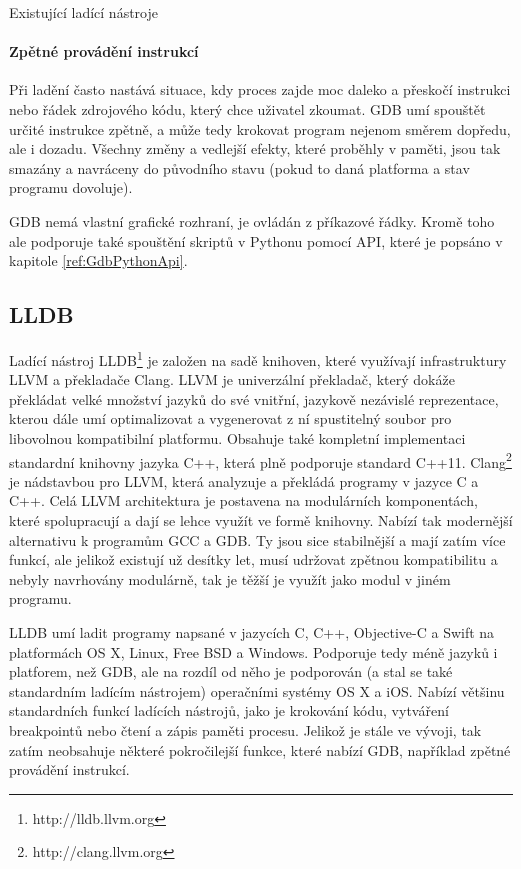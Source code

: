 \documentclass[czech,bachelor,male,python,dept460,hidelinks]{diploma}						%
\newcommand{\parspace}[1][]{
	\ifthenelse{\isempty{#1}}{\vspace{5mm}}{\vspace{#1}}
	\par
}
\begin{document}
\begin{section}{Existující ladící nástroje}
		\paragraph*{Zpětné provádění instrukcí}
			Při ladění často nastává situace, kdy proces zajde moc daleko a přeskočí instrukci nebo řádek zdrojového kódu, který chce uživatel zkoumat.
			GDB umí spouštět určité instrukce zpětně, a může tedy krokovat program nejenom směrem dopředu, ale i dozadu.
			Všechny změny a vedlejší efekty, které proběhly v paměti, jsou tak smazány a navráceny do původního stavu (pokud to daná platforma a stav programu dovoluje).
		
		\parspace GDB nemá vlastní grafické rozhraní, je ovládán z příkazové řádky. Kromě toho ale podporuje také spouštění skriptů v Pythonu pomocí API,
		které je popsáno v kapitole \ref{ref:GdbPythonApi}.
	\subsection{LLDB}
		Ladící nástroj LLDB\footnote{http://lldb.llvm.org} je založen na sadě knihoven, které využívají infrastruktury LLVM a překladače Clang.
		LLVM je univerzální překladač, který dokáže překládat velké množství jazyků do své vnitřní, jazykově nezávislé reprezentace, kterou dále umí
		optimalizovat a vygenerovat z ní spustitelný soubor pro libovolnou kompatibilní platformu. Obsahuje také kompletní implementaci standardní
		knihovny jazyka C++, která plně podporuje standard C++11. Clang\footnote{http://clang.llvm.org} je nádstavbou pro LLVM, která analyzuje a
		překládá programy v jazyce C a C++. Celá LLVM architektura je postavena na modulárních komponentách, které spolupracují a dají se lehce využít ve
		formě knihovny. Nabízí tak modernější alternativu k programům GCC a GDB. Ty jsou sice stabilnější a mají zatím více funkcí, ale jelikož existují už
		desítky let, musí udržovat zpětnou kompatibilitu a nebyly navrhovány modulárně, tak je těžší je využít jako modul v jiném programu.
		
		\parspace LLDB umí ladit programy napsané v jazycích C, C++, Objective-C a Swift na platformách OS X, Linux, Free BSD a Windows. Podporuje tedy méně jazyků
		i platforem, než GDB, ale na rozdíl od něho je podporován (a stal se také standardním ladícím nástrojem) operačními systémy OS X a iOS.
		Nabízí většinu standardních funkcí ladících nástrojů, jako je krokování kódu, vytváření breakpointů nebo čtení a zápis paměti procesu.
		Jelikož je stále ve vývoji, tak zatím neobsahuje některé pokročilejší funkce, které nabízí GDB, například zpětné provádění instrukcí.


\end{section}
\end{document}
